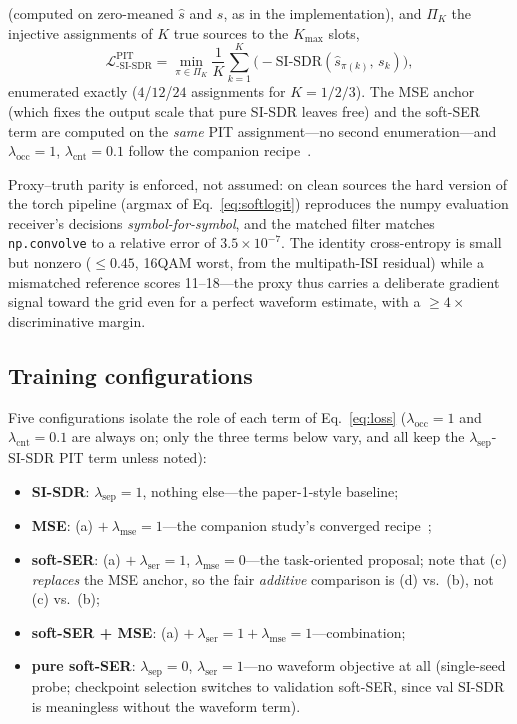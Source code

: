 \documentclass[review,12pt]{elsarticle}
\begin{document}
(computed on zero-meaned $\hat{s}$ and $s$, as in the implementation),
and $\Pi_K$ the injective assignments of $K$ true sources to the
$K_{\max}$ slots,
\begin{equation}
  \mathcal{L}_{\text{-SI-SDR}}^{\mathrm{PIT}} =
  \min_{\pi \in \Pi_K} \frac{1}{K} \sum_{k=1}^{K}
  \big(-\mathrm{SI\text{-}SDR}(\hat{s}_{\pi(k)},\, s_k)\big),
  \label{eq:pit}
\end{equation}
enumerated exactly ($4$/$12$/$24$ assignments for $K = 1/2/3$).
The MSE anchor (which fixes the output scale that pure SI-SDR
leaves free) and the soft-SER term are computed on the \emph{same}
PIT assignment---no second enumeration---and
$\lambda_{\mathrm{occ}} = 1$, $\lambda_{\mathrm{cnt}} = 0.1$ follow the
companion recipe~\cite{nong2026openworld}.

Proxy--truth parity is enforced, not assumed: on clean sources the hard
version of the torch pipeline (argmax of Eq.~\eqref{eq:softlogit})
reproduces the numpy evaluation receiver's decisions
\emph{symbol-for-symbol}, and the matched filter matches
\texttt{np.convolve} to a relative error of $3.5\times10^{-7}$. The
identity cross-entropy is small but nonzero ($\leq 0.45$, 16QAM worst,
from the multipath-ISI residual) while a mismatched reference scores
11--18---the proxy thus carries a deliberate gradient signal toward the
grid even for a perfect waveform estimate, with a $\geq 4\times$
discriminative margin.

\subsection{Training configurations}
\label{sec:configs}

Five configurations isolate the role of each term of
Eq.~\eqref{eq:loss} ($\lambda_{\mathrm{occ}} = 1$ and
$\lambda_{\mathrm{cnt}} = 0.1$ are always on; only the three terms below
vary, and all keep the $\lambda_{\mathrm{sep}}$-SI-SDR PIT term unless
noted):
\begin{itemize}
  \item[\textbf{(a)}] \textbf{SI-SDR}: $\lambda_{\mathrm{sep}} = 1$,
        nothing else---the paper-1-style baseline;
  \item[\textbf{(b)}] \textbf{MSE}: (a) $+\ \lambda_{\mathrm{mse}} = 1$---the
        companion study's converged recipe~\cite{nong2026openworld};
  \item[\textbf{(c)}] \textbf{soft-SER}: (a) $+\ \lambda_{\mathrm{ser}} = 1$,
        $\lambda_{\mathrm{mse}} = 0$---the task-oriented proposal; note
        that (c) \emph{replaces} the MSE anchor, so the fair
        \emph{additive} comparison is (d) vs.\ (b), not (c) vs.\ (b);
  \item[\textbf{(d)}] \textbf{soft-SER + MSE}: (a) $+\ \lambda_{\mathrm{ser}}
        = 1 + \lambda_{\mathrm{mse}} = 1$---combination;
  \item[\textbf{(e)}] \textbf{pure soft-SER}: $\lambda_{\mathrm{sep}} = 0$,
        $\lambda_{\mathrm{ser}} = 1$---no waveform objective at all
        (single-seed probe; checkpoint selection switches to validation
        soft-SER, since val SI-SDR is meaningless without the waveform
        term).
\end{itemize}
\end{document}
